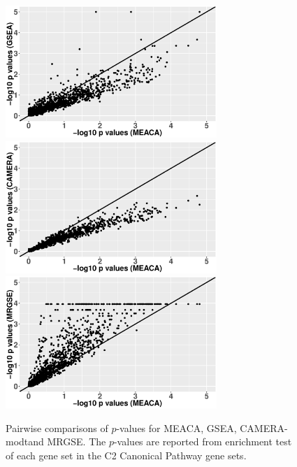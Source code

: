 \documentclass[a4,center,fleqn]{NAR}
\newcommand{\OurMethod}{MEACA}
\newcommand{\CMT}{CAMERA-modt}
\newcommand{\genr}{MRGSE}
\begin{document}
		\begin{figure}[h!]
			\begin{center}
				\includegraphics[width=8cm,height=5cm]{Figures/MEQLEA_GSEA.eps}
				\includegraphics[width=8cm,height=5cm]{Figures/MEQLEA_Camera.eps}
				\includegraphics[width=8cm,height=5cm]{Figures/MEQLEA_MRGSE.eps}
			\end{center} 
			\caption[Pairwise comparisons of $p$-values for different methods]{Pairwise comparisons 
			of $p$-values for \OurMethod, GSEA, \CMT and \genr. The $p$-values 
				are reported from enrichment test of each gene set in the C2 Canonical Pathway gene 
				sets.
			}\label{fig:HDdatap}
		\end{figure} 
		
		
\end{document}

